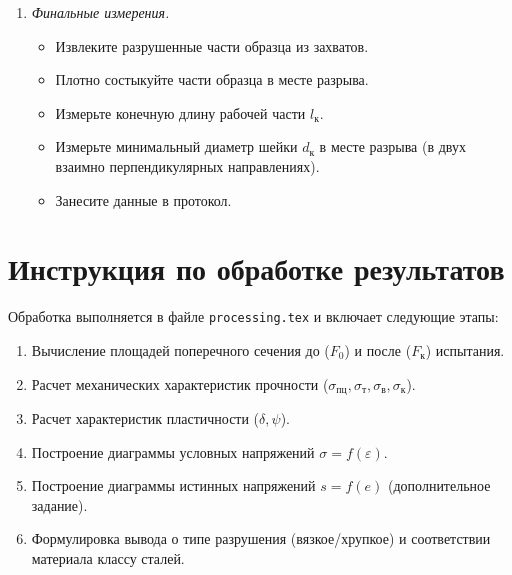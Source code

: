 \begin{enumerate}
    \item \textit{Финальные измерения.}
    \begin{itemize}
        \item Извлеките разрушенные части образца из захватов.
        \item Плотно состыкуйте части образца в месте разрыва.
        \item Измерьте конечную длину рабочей части $l_{\text{к}}$.
        \item Измерьте минимальный диаметр шейки $d_{\text{к}}$ в месте разрыва (в двух взаимно перпендикулярных направлениях).
        \item Занесите данные в протокол.
    \end{itemize}
\end{enumerate}

\section*{Инструкция по обработке результатов}
Обработка выполняется в файле \texttt{processing.tex} и включает следующие этапы:
\begin{enumerate}
    \item Вычисление площадей поперечного сечения до ($F_0$) и после ($F_{\text{к}}$) испытания.
    \item Расчет механических характеристик прочности ($\sigma_{\text{пц}}, \sigma_{\text{т}}, \sigma_{\text{в}}, \sigma_{\text{к}}$).
    \item Расчет характеристик пластичности ($\delta, \psi$).
    \item Построение диаграммы условных напряжений $\sigma = f(\varepsilon)$.
    \item Построение диаграммы истинных напряжений $s = f(e)$ (дополнительное задание).
    \item Формулировка вывода о типе разрушения (вязкое/хрупкое) и соответствии материала классу сталей.
\end{enumerate}
